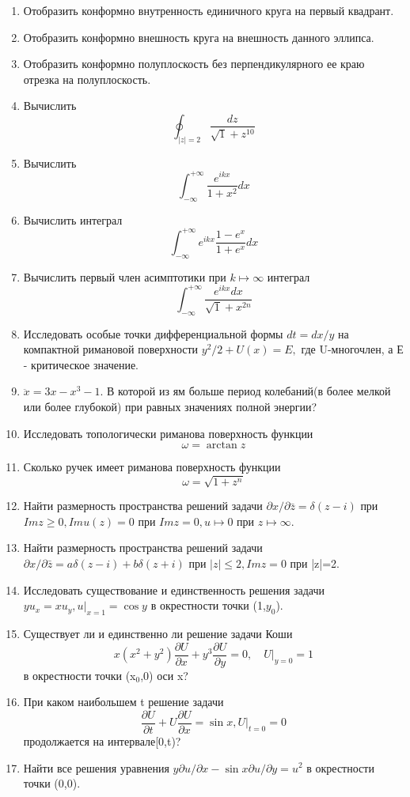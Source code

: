 \documentclass{article}
\begin{document}
\begin{enumerate}
\item Отобразить конформно внутренность единичного круга на первый квадрант.
\item Отобразить конформно внешность круга на внешность данного эллипса.
\item Отобразить конформно полуплоскость без перпендикулярного ее краю отрезка на полуплоскость.
\item Вычислить $$ \oint_{|z|=2} \frac{dz}{\sqrt1+z^{10}}$$
\item Вычислить $$ \int_{-\infty}^{+\infty}\frac{e^{ikx}}{1+x^{2}}dx$$
\item Вычислить интеграл $$ \int_{-\infty}^{+\infty}e^{ikx}\frac{1-e^{x}}{1+e^{x}}dx$$
\item Вычислить первый член асимптотики при $k\mapsto\infty$ интеграл $$\int_{-\infty}^{+\infty}\frac{e^{ikx}dx}{\sqrt1+x^{2n}}$$
\item Исследовать особые точки дифференциальной формы $dt=dx/y$ на компактной римановой поверхности $y^{2}/2+U(x)=E,$ где U-многочлен, а Е - критическое значение.
\item $\ddot{x}=3x-x^{3}-1.$ В которой из ям больше период колебаний(в более мелкой или более глубокой) при равных значениях полной энергии?
\item Исследовать топологически риманова поверхность функции $$\omega=\arctan z$$
\item Сколько ручек имеет риманова поверхность функции $$\omega=\sqrt{1+z^{n}}$$
\item Найти размерность пространства решений задачи $\partial{x}/\partial\bar{z}=\delta(z-i)$ при $Imz\geq 0,Imu(z)=0$ при $Imz=0, u\mapsto0$ при $ z\mapsto\infty$.
\item Найти размерность пространства решений задачи $\partial{x}/\partial\bar{z}=a\delta(z-i)+b\delta(z+i)$ при $|z|\leq2, Imz=0$ при |z|=2.
\item Исследовать существование и единственность решения задачи $yu_{x}=xu_{y}, u|_{x=1}=\cos y$ в окрестности точки (1,$y_{0}$).
\item Существует ли и единственно ли решение задачи Коши $$x(x^{2}+y^{2})\frac{\partial U}{\partial x}+y^{3}\frac{\partial U}{\partial y} =0,\quad U|_{y=0}=1$$ в окрестности точки (x$_{0}$,0) оси x?
\item При каком наибольшем t решение задачи $$\frac{\partial U}{\partial t}+U\frac{\partial U}{\partial x}=\sin{x}, U|_{t=0}=0$$ продолжается на интервале[0,t)?
\item Найти все решения уравнения $y\partial u/\partial x-\sin x\partial u/\partial y=u^{2}$ в окрестности точки (0,0).

\end{enumerate}
\end{document}
